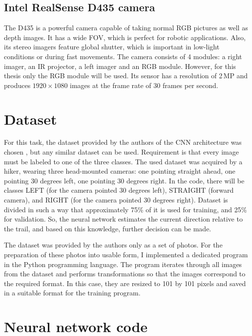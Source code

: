 \subsection{Intel RealSense D435 camera}

The D435 is a powerful camera capable of taking normal \acs{RGB} pictures as well as depth images. It has a wide \acs{FOV}, which is perfect for robotic applications. Also, its stereo imagers feature global shutter, which is important in low-light conditions or during fast movements. The camera consists of 4 modules: a right imager, an \acs{IR} projector, a left imager and an \acs{RGB} module. However, for this thesis only the \acs{RGB} module will be used. Its sensor has a resolution of 2\,MP and produces $1920\times1080$ images at the frame rate of 30 frames per second.


\section{Dataset}

For this task, the dataset provided by the authors of the \acs{CNN} architecture was chosen \cite{giusti2016machine}, but any similar dataset can be used. Requirement is that every image must be labeled to one of the three classes. The used dataset was acquired by a hiker, wearing three head-mounted cameras: one pointing straight ahead, one pointing 30 degrees left, one pointing 30 degrees right. In the code, there will be classes LEFT (for the camera pointed 30 degrees left), STRAIGHT (forward camera), and RIGHT (for the camera pointed 30 degrees right). Dataset is divided in such a way that approximately 75\% of it is used for training, and 25\% for validation. So, the neural network estimates the current direction relative to the trail, and based on this knowledge, further decision can be made.

The dataset was provided by the authors only as a set of photos. For the preparation of these photos into usable form, I implemented a dedicated program in the Python programming language. The program iterates through all images from the dataset and performs transformations so that the images correspond to the required format. In this case, they are resized to 101 by 101 pixels and saved in a suitable format for the training program.

\section{Neural network code}

